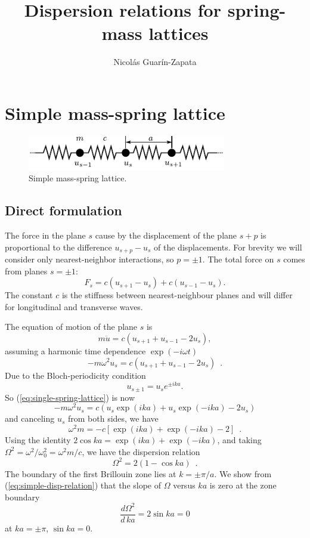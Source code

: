\documentclass[11pt]{article}
\title{\textbf{Dispersion relations for spring-mass lattices}}
\author{Nicolás Guarín-Zapata}
\begin{document}
\maketitle


\section{Simple mass-spring lattice}
\begin{figure}[h]
\centering
\includegraphics[height=1.5cm]{img/spring-mass.pdf} 
\caption{Simple mass-spring lattice.}
\end{figure}
\subsection{Direct formulation}
The force in the plane $s$ cause by the displacement of the plane $s+p$ is proportional to the difference $u_{s+p}-u_s$ of the displacements. For brevity we will consider only nearest-neighbor interactions, so $p=\pm 1$. The total force on $s$ comes from planes $s=\pm 1$:
\begin{equation}
F_s = c(u_{s+1}-u_s)+ c(u_{s-1}-u_s).
\end{equation}
The constant $c$ is the stiffness between nearest-neighbour planes and will differ for longitudinal and transverse waves.

The equation of motion of the plane $s$ is
\[ m  \ddot{u} = c(u_{s+1} + u_{s-1} -2 u_s), \]
assuming a harmonic time dependence $\exp(-i\omega t)$
\begin{equation}
-m\omega^2 u_s = c(u_{s+1} + u_{s-1} - 2u_s) \enspace .
\label{eq:single-spring-lattice}
\end{equation}
Due to the Bloch-periodicity condition
\[u_{s\pm 1} = u_s e^{\pm i ka}. \]
So (\ref{eq:single-spring-lattice}) is now
\[ -m \omega^2 u_s = c (u_s \exp(ika) + u_s \exp(-ika) - 2u_s) \]
and canceling $u_s$ from both sides, we have
\[ \omega^2 m = -c[ \exp(ika) + \exp(-ika) - 2 ] \enspace .\]
Using the identity $2\cos ka = \exp(ika) + \exp(-ika)$, and taking $\Omega^2 = \omega^2/\omega_0^2 = \omega^2 m/c$, we have the dispersion relation
\begin{equation}
\Omega^2 = 2 (1-\cos ka) \enspace .
\label{eq:simple-disp-relation}
\end{equation}
The boundary of the first Brillouin zone lies at $k=\pm \pi/a$. We show from (\ref{eq:simple-disp-relation}) that the slope of $\Omega$ versus $ka$ is zero at the zone boundary
\[ \frac{d\Omega^2}{d\, ka} = 2\sin ka=0\]
at $ka=\pm \pi$, $\sin ka = 0$.
\end{document}
